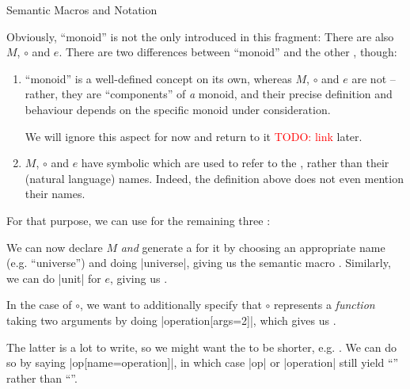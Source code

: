 \documentclass[lang={en,de}]{stex}
\begin{document}
    \begin{sfragment}{Semantic Macros and Notation}


    Obviously, ``monoid'' is not the only  introduced in this
    fragment: There are also $M$, $\circ$ and $e$.
    There are two differences between ``monoid'' and the other ,
    though:
    \begin{enumerate}
        \item ``monoid'' is a well-defined concept on its own,
        whereas $M$, $\circ$ and $e$ are not -- rather, they are 
        ``components'' of \emph{a} monoid, and their precise definition
        and behaviour depends on the specific monoid under consideration.

        We will ignore this aspect for now and return to it 
        \textcolor{red}{TODO: link} later.
        \item $M$, $\circ$ and $e$ have symbolic 
        which are used to refer to the , rather than their
        (natural language) names. Indeed, the definition above does
        not even mention their names.
    \end{enumerate}

    For that purpose, we can use  for the remaining
    three :



    We can now declare $M$ \emph{and} generate a  
    for it by choosing an
    appropriate name (e.g. ``universe'') and doing
    |{universe}|, giving us the semantic macro
    . Similarly, we can do
    |{unit}| for $e$, giving us . 
    
    In the case of $\circ$,
    we want to additionally specify that $\circ$ represents
    a \emph{function} taking two arguments by doing
    |{operation}[args=2]|, which gives us
    .

    

    The latter is a lot to write, so we might want the
     to be shorter, e.g. .
    We can do so by saying |{op}[name=operation]|,
    in which case |{op}| or |{operation}|
    still yield ``'' rather than ``''.


\end{sfragment}
\end{document}
